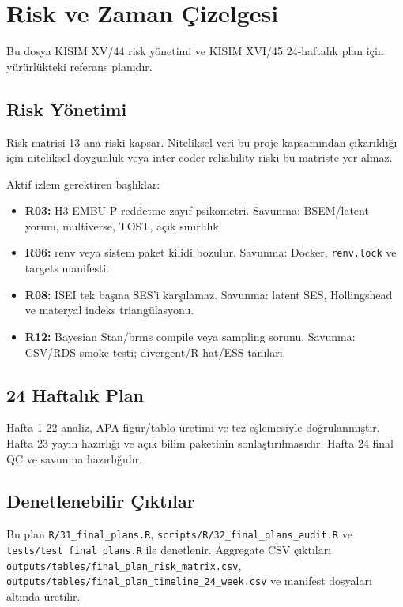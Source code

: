 \documentclass[
  turkish,
  12pt,
  a4paper,
]{report}
\author{}
\date{}
\providecommand{\tightlist}{%
  \setlength{\itemsep}{0pt}\setlength{\parskip}{0pt}}
\renewcommand*\contentsname{İçindekiler}
\newcommand\contentsname{İçindekiler}
\renewcommand*\listfigurename{Şekil Listesi}
\newcommand\listfigurename{Şekil Listesi}
\renewcommand*\listtablename{Tablo Listesi}
\newcommand\listtablename{Tablo Listesi}
\begin{document}
\renewcommand{\listfigurename}{ŞEKİLLER DİZİNİ}
\renewcommand{\listtablename}{TABLOLAR DİZİNİ}

\renewcommand*\contentsname{İÇİNDEKİLER}
{
\hypersetup{linkcolor=black}
\setcounter{tocdepth}{2}
\tableofcontents
}
\listoffigures
\listoftables

\chapter{Risk ve Zaman Çizelgesi}\label{risk-ve-zaman-uxe7izelgesi}

Bu dosya KISIM XV/44 risk yönetimi ve KISIM XVI/45 24-haftalık plan için
yürürlükteki referans planıdır.

\section{Risk Yönetimi}\label{risk-yuxf6netimi}

Risk matrisi 13 ana riski kapsar. Niteliksel veri bu proje kapsamından
çıkarıldığı için niteliksel doygunluk veya inter-coder reliability riski
bu matriste yer almaz.

Aktif izlem gerektiren başlıklar:

\begin{itemize}
\tightlist
\item
  \textbf{R03:} H3 EMBU-P reddetme zayıf psikometri. Savunma: BSEM/latent
  yorum, multiverse, TOST, açık sınırlılık.
\item
  \textbf{R06:} renv veya sistem paket kilidi bozulur. Savunma: Docker,
  \texttt{renv.lock} ve targets manifesti.
\item
  \textbf{R08:} ISEI tek başına SES'i karşılamaz. Savunma: latent SES,
  Hollingshead ve materyal indeks triangülasyonu.
\item
  \textbf{R12:} Bayesian Stan/brms compile veya sampling sorunu.
  Savunma: CSV/RDS smoke testi; divergent/R-hat/ESS tanıları.
\end{itemize}

\section{24 Haftalık Plan}\label{haftalux131k-plan}

Hafta 1-22 analiz, APA figür/tablo üretimi ve tez eşlemesiyle
doğrulanmıştır. Hafta 23 yayın hazırlığı ve açık bilim paketinin
sonlaştırılmasıdır. Hafta 24 final QC ve savunma hazırlığıdır.

\section{Denetlenebilir
Çıktılar}\label{denetlenebilir-uxe7ux131ktux131lar}

Bu plan \texttt{R/31\_final\_plans.R},
\texttt{scripts/R/32\_final\_plans\_audit.R} ve
\texttt{tests/test\_final\_plans.R} ile denetlenir. Aggregate CSV
çıktıları \texttt{outputs/tables/final\_plan\_risk\_matrix.csv},
\texttt{outputs/tables/final\_plan\_timeline\_24\_week.csv} ve manifest
dosyaları altında üretilir.
\end{document}
